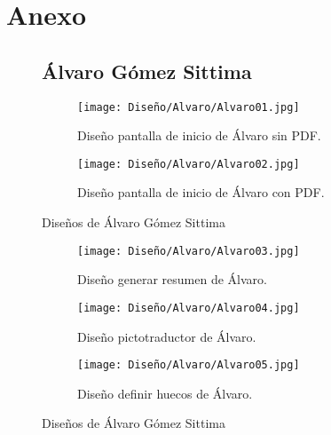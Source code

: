 \chapter{Anexo}
\label{cap:anexo}

\begin{figure}[ht!]
  \section{Álvaro Gómez Sittima}
  \label{sec:disenyoAlvaro}
  \begin{subfigure}{\textwidth}
    \centering
    \texttt{[image: Diseño/Alvaro/Alvaro01.jpg]}
    \caption{Diseño pantalla de inicio de Álvaro sin PDF.}
    \label{fig:disenyoAlvaro01}
  \end{subfigure}

  \begin{subfigure}{\textwidth}
    \centering
    \texttt{[image: Diseño/Alvaro/Alvaro02.jpg]}
    \caption{Diseño pantalla de inicio de Álvaro con PDF.}
    \label{fig:disenyoAlvaro02}
  \end{subfigure}
  \caption{Diseños de Álvaro Gómez Sittima}
  \label{fig:disenyoAlvaro}
\end{figure}

\begin{figure}[ht!]
  \ContinuedFloat

  \begin{subfigure}{\textwidth}
    \centering
    \texttt{[image: Diseño/Alvaro/Alvaro03.jpg]}
    \caption{Diseño generar resumen de Álvaro.}
    \label{fig:disenyoAlvaro03}
  \end{subfigure}

  \begin{subfigure}{\textwidth}
    \centering
    \texttt{[image: Diseño/Alvaro/Alvaro04.jpg]}
    \caption{Diseño pictotraductor de Álvaro.}
    \label{fig:disenyoAlvaro04}
  \end{subfigure}

  \begin{subfigure}{\textwidth}
    \centering
    \texttt{[image: Diseño/Alvaro/Alvaro05.jpg]}
    \caption{Diseño definir huecos de Álvaro.}
    \label{fig:disenyoAlvaro05}
  \end{subfigure}

  \caption{Diseños de Álvaro Gómez Sittima}
  \label{fig:disenyoAlvaro}
\end{figure}


